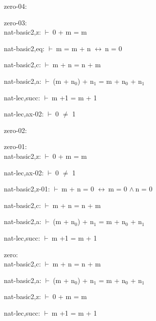 \documentclass[a4paper]{article}
\newcommand{\Fol}{\mbox{$\vdash\ $}}
\newcommand{\And}{\mbox{$\wedge\ $}}
\newcommand{\Equiv}{\mbox{$\leftrightarrow\ $}}
\begin{document}
\raggedright
              
zero-04:\\ 

\bigskip

zero-03:\\ nat-basic2,z: 
 \Fol 0 + m = m



nat-basic2,eq: 
 \Fol m = m + n \Equiv n = 0



nat-basic2,c: 
 \Fol m + n = n + m



nat-basic2,a: 
 \Fol (m + $\mbox{n}_{0}$) + $\mbox{n}_{1}$ = m + $\mbox{n}_{0}$ + $\mbox{n}_{1}$



nat-lec,succ: 
 \Fol m +1 = m + 1



nat-lec,ax-02: 
 \Fol 0 $\neq$ 1



\bigskip

zero-02:\\ 

\bigskip

zero-01:\\ nat-basic2,z: 
 \Fol 0 + m = m



nat-lec,ax-02: 
 \Fol 0 $\neq$ 1



nat-basic2,z-01: 
 \Fol m + n = 0 \Equiv m = 0 \And n = 0



nat-basic2,c: 
 \Fol m + n = n + m



nat-basic2,a: 
 \Fol (m + $\mbox{n}_{0}$) + $\mbox{n}_{1}$ = m + $\mbox{n}_{0}$ + $\mbox{n}_{1}$



nat-lec,succ: 
 \Fol m +1 = m + 1



\bigskip

zero:\\ nat-basic2,c: 
 \Fol m + n = n + m



nat-basic2,a: 
 \Fol (m + $\mbox{n}_{0}$) + $\mbox{n}_{1}$ = m + $\mbox{n}_{0}$ + $\mbox{n}_{1}$



nat-basic2,z: 
 \Fol 0 + m = m



nat-lec,succ: 
 \Fol m +1 = m + 1
\end{document}
